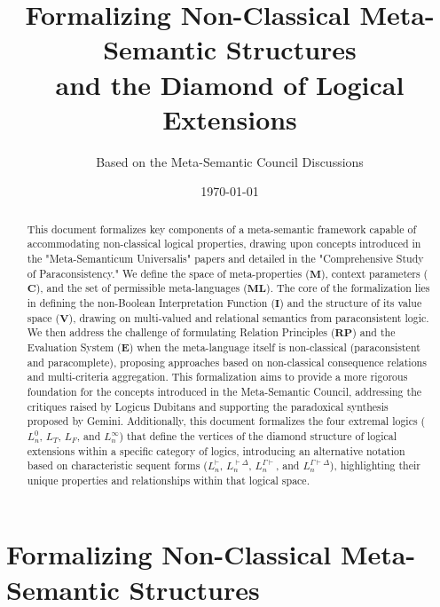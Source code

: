 \documentclass{article}
\title{Formalizing Non-Classical Meta-Semantic Structures \\ and the Diamond of Logical Extensions} %
\author{Based on the Meta-Semantic Council Discussions} %
\date{\today} %
\newcommand{\MetaProps}{\mathbf{M}}
\newcommand{\ContextParams}{\mathbf{C}}
\newcommand{\InterpFunc}{\mathbf{I}}
\newcommand{\RelPrinciples}{\mathbf{RP}}
\newcommand{\EvalSystem}{\mathbf{E}}
\newcommand{\ValueSpace}{\mathbf{V}}
\newcommand{\MetaLang}{\mathbf{ML}}
\newcommand{\LT}{L_T} %
\newcommand{\LF}{L_F} %
\begin{document}
	
	\maketitle
	
	\begin{abstract}
		\RaggedRight %
		This document formalizes key components of a meta-semantic framework capable of accommodating non-classical logical properties, drawing upon concepts introduced in the "Meta-Semanticum Universalis" papers and detailed in the "Comprehensive Study of Paraconsistency." We define the space of meta-properties ($\MetaProps$), context parameters ($\ContextParams$), and the set of permissible meta-languages ($\MetaLang$). The core of the formalization lies in defining the non-Boolean Interpretation Function ($\InterpFunc$) and the structure of its value space ($\ValueSpace$), drawing on multi-valued and relational semantics from paraconsistent logic. We then address the challenge of formulating Relation Principles ($\RelPrinciples$) and the Evaluation System ($\EvalSystem$) when the meta-language itself is non-classical (paraconsistent and paracomplete), proposing approaches based on non-classical consequence relations and multi-criteria aggregation. This formalization aims to provide a more rigorous foundation for the concepts introduced in the Meta-Semantic Council, addressing the critiques raised by Logicus Dubitans and supporting the paradoxical synthesis proposed by Gemini. Additionally, this document formalizes the four extremal logics ($L^0_n$, $\LT$, $\LF$, and $L^\infty_n$) that define the vertices of the diamond structure of logical extensions within a specific category of logics, introducing an alternative notation based on characteristic sequent forms ($L^{\vdash}_n$, $L^{\vdash\Delta}_n$, $L^{\Gamma\vdash}_n$, and $L^{\Gamma\vdash\Delta}_n$), highlighting their unique properties and relationships within that logical space.
	\end{abstract}
	
	\tableofcontents
	
	\part{Formalizing Non-Classical Meta-Semantic Structures} %
	
\end{document}
